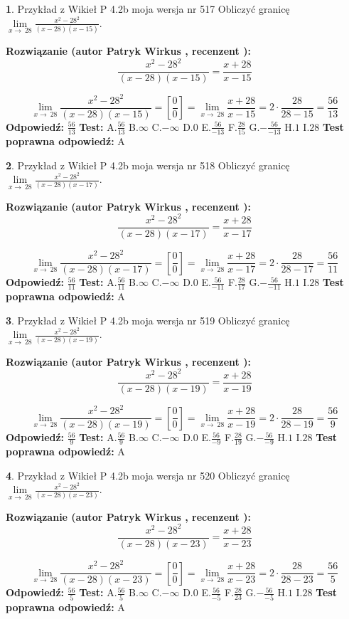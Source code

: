 \documentclass[12pt, a4paper]{article}
\theoremstyle{definition} %
\newtheorem{zad}{}
\newcommand{\zadStart}[1]{\begin{zad}#1\newline}
\newcommand{\zadStop}{\end{zad}}
\newcommand{\rozwStart}[2]{\noindent \textbf{Rozwiązanie (autor #1 , recenzent #2): }\newline}
\newcommand{\rozwStop}{\newline}
\newcommand{\odpStart}{\noindent \textbf{Odpowiedź:}\newline}
\newcommand{\odpStop}{\newline}
\newcommand{\testStart}{\noindent \textbf{Test:}\newline}
\newcommand{\testStop}{\newline}
\newcommand{\kluczStart}{\noindent \textbf{Test poprawna odpowiedź:}\newline}
\newcommand{\kluczStop}{\newline}
\begin{document}
\zadStart{Przykład z Wikieł P 4.2b moja wersja nr 517}
Obliczyć granicę $\lim\limits_{x\to\ 28}\frac{x^{2}-28^{2}}{(x-28)(x-15)}$.
\zadStop
\rozwStart{Patryk Wirkus}{}
$$\frac{x^{2}-28^{2}}{(x-28)(x-15)}=\frac{x+28}{x-15}$$

$$\lim\limits_{x\to\ 28}\frac{x^{2}-28^{2}}{(x-28)(x-15)}=[\frac{0}{0}]=\lim\limits_{x\to\ 28}\frac{x+28}{x-15}=2 \cdot \frac{28}{28-15} = \frac{56}{13}$$
\rozwStop
\odpStart
$\frac{56}{13}$
\odpStop
\testStart
A.$\frac{56}{13}$
B.$\infty$
C.$-\infty$
D.$0$
E.$\frac{56}{-13}$
F.$\frac{28}{15}$
G.$-\frac{56}{-13}$
H.$1$
I.$28$
\testStop
\kluczStart
A
\kluczStop



\zadStart{Przykład z Wikieł P 4.2b moja wersja nr 518}
Obliczyć granicę $\lim\limits_{x\to\ 28}\frac{x^{2}-28^{2}}{(x-28)(x-17)}$.
\zadStop
\rozwStart{Patryk Wirkus}{}
$$\frac{x^{2}-28^{2}}{(x-28)(x-17)}=\frac{x+28}{x-17}$$

$$\lim\limits_{x\to\ 28}\frac{x^{2}-28^{2}}{(x-28)(x-17)}=[\frac{0}{0}]=\lim\limits_{x\to\ 28}\frac{x+28}{x-17}=2 \cdot \frac{28}{28-17} = \frac{56}{11}$$
\rozwStop
\odpStart
$\frac{56}{11}$
\odpStop
\testStart
A.$\frac{56}{11}$
B.$\infty$
C.$-\infty$
D.$0$
E.$\frac{56}{-11}$
F.$\frac{28}{17}$
G.$-\frac{56}{-11}$
H.$1$
I.$28$
\testStop
\kluczStart
A
\kluczStop



\zadStart{Przykład z Wikieł P 4.2b moja wersja nr 519}
Obliczyć granicę $\lim\limits_{x\to\ 28}\frac{x^{2}-28^{2}}{(x-28)(x-19)}$.
\zadStop
\rozwStart{Patryk Wirkus}{}
$$\frac{x^{2}-28^{2}}{(x-28)(x-19)}=\frac{x+28}{x-19}$$

$$\lim\limits_{x\to\ 28}\frac{x^{2}-28^{2}}{(x-28)(x-19)}=[\frac{0}{0}]=\lim\limits_{x\to\ 28}\frac{x+28}{x-19}=2 \cdot \frac{28}{28-19} = \frac{56}{9}$$
\rozwStop
\odpStart
$\frac{56}{9}$
\odpStop
\testStart
A.$\frac{56}{9}$
B.$\infty$
C.$-\infty$
D.$0$
E.$\frac{56}{-9}$
F.$\frac{28}{19}$
G.$-\frac{56}{-9}$
H.$1$
I.$28$
\testStop
\kluczStart
A
\kluczStop



\zadStart{Przykład z Wikieł P 4.2b moja wersja nr 520}
Obliczyć granicę $\lim\limits_{x\to\ 28}\frac{x^{2}-28^{2}}{(x-28)(x-23)}$.
\zadStop
\rozwStart{Patryk Wirkus}{}
$$\frac{x^{2}-28^{2}}{(x-28)(x-23)}=\frac{x+28}{x-23}$$

$$\lim\limits_{x\to\ 28}\frac{x^{2}-28^{2}}{(x-28)(x-23)}=[\frac{0}{0}]=\lim\limits_{x\to\ 28}\frac{x+28}{x-23}=2 \cdot \frac{28}{28-23} = \frac{56}{5}$$
\rozwStop
\odpStart
$\frac{56}{5}$
\odpStop
\testStart
A.$\frac{56}{5}$
B.$\infty$
C.$-\infty$
D.$0$
E.$\frac{56}{-5}$
F.$\frac{28}{23}$
G.$-\frac{56}{-5}$
H.$1$
I.$28$
\testStop
\kluczStart
A
\kluczStop
\end{document}
